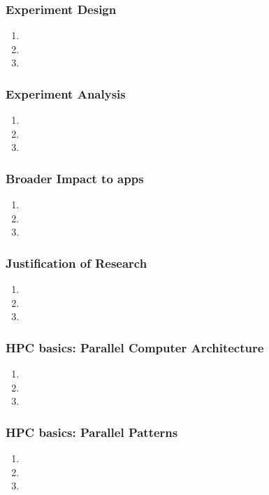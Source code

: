 \begin{frame}
\frametitle{Experiment Design}
\begin{enumerate}
\item 
\item 
\item 
\end{enumerate}
\end{frame}


\begin{frame}
\frametitle{Experiment Analysis}
\begin{enumerate}
\item 
\item 
\item 
\end{enumerate}
\end{frame}


\begin{frame}
\frametitle{Broader Impact to apps}
\begin{enumerate}
\item 
\item 
\item 
\end{enumerate}
\end{frame}



\begin{frame}
\frametitle{Justification of Research}
\begin{enumerate}
\item 
\item 
\item 
\end{enumerate}
\end{frame}



\begin{frame}
\frametitle{HPC basics: Parallel Computer Architecture}
\begin{enumerate}
\item 
\item 
\item 
\end{enumerate}
\end{frame}


\begin{frame}
\frametitle{HPC basics: Parallel Patterns}
\begin{enumerate}
\item 
\item 
\item 
\end{enumerate}
\end{frame}


